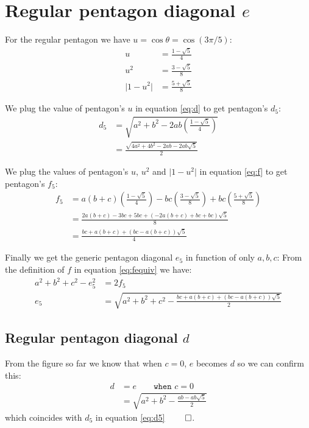 \documentclass[11pt]{article}
\begin{document}
\section{Regular pentagon diagonal $e$}

For the regular pentagon we have $u = \cos\theta = \cos(3\pi/5)$:
\begin{align}
u &= \frac{1-\sqrt{5}}{4}\\
u^2 &= \frac{3-\sqrt{5}}{8}\\
\lvert 1-u^2 \rvert &= \frac{5+\sqrt5}{8}
\end{align}

We plug the value of pentagon's $u$ in equation \ref{eq:d}
to get pentagon's $d_5$:
\begin{align}
d_5 &= \sqrt{a^2 + b^2 - 2ab\left(\frac{1-\sqrt{5}}{4}\right)} \nonumber\\
 &= \frac{\sqrt{4a^2 + 4b^2 - 2ab - 2ab\sqrt5}}{2} \label{eq:d5}
\end{align}

We plug the values of pentagon's $u$, $u^2$ and $\lvert 1-u^2 \rvert$ in equation \ref{eq:f}
to get pentagon's $f_5$:
\begin{align}
f_5 &= a\left(b+c\right)\left(\frac{1-\sqrt5}4\right)
 - bc\left(\frac{3-\sqrt5}8\right)
 + bc\left(\frac{5+\sqrt5}8\right)\nonumber\\
 &= \frac{2a(b+c) - 3bc + 5bc + (-2a(b+c) +bc + bc)\sqrt5}8\nonumber\\
 &= \frac{bc + a(b+c) + (bc - a(b+c))\sqrt5}4 \label{eq:f5}
\end{align}

Finally we get the generic pentagon diagonal $e_5$ in function of only $a,b,c$:
From the definition of $f$ in equation \ref{eq:fequiv} we have:
\begin{align}
a^2 + b^2 + c^2 - e^2_5 &= 2f_5 \nonumber\\
e_5 &= \sqrt{a^2 + b^2 + c^2 - \frac{bc + a(b+c) + (bc - a(b+c))\sqrt5}2} \label{eq:e5}
\end{align}

\subsection {Regular pentagon diagonal $d$}

From the figure so far we know that when $c=0$, $e$ becomes $d$ so we can confirm this:
\begin{align}
d &= e \qquad \texttt{when } c=0 \nonumber\\
 &= \sqrt{a^2 + b^2 - \frac{ ab - ab\sqrt5}2}
\end{align}
which coincides with $d_5$ in equation \ref{eq:d5} $\qed$.
\end{document}
